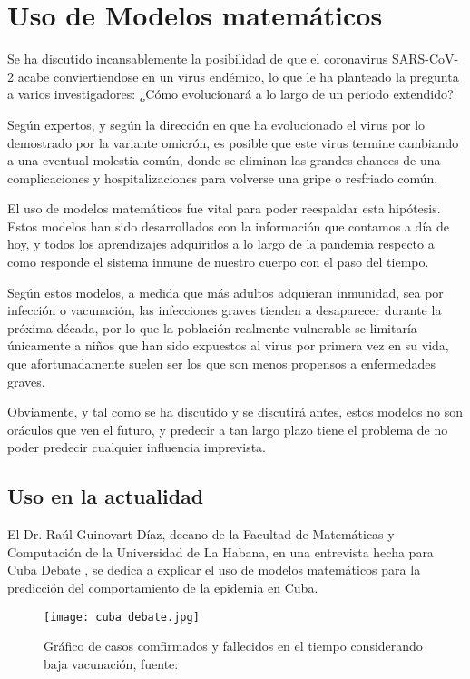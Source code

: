 \section{Uso de Modelos matemáticos}
Se ha discutido incansablemente la posibilidad de que el coronavirus SARS-CoV-2 acabe conviertiendose en un virus endémico, lo que le ha planteado la pregunta a varios investigadores: ¿Cómo evolucionará a lo largo de un periodo extendido?

Según expertos, y según la dirección en que ha evolucionado el virus por lo demostrado por la variante omicrón, es posible que este virus termine cambiando a una eventual molestia común, donde se eliminan las grandes chances de una complicaciones y hospitalizaciones para volverse una gripe o resfriado común.

El uso de modelos matemáticos fue vital para poder reespaldar esta hipótesis. Estos modelos han sido desarrollados con la información que contamos a día de hoy, y todos los aprendizajes adquiridos a lo largo de la pandemia respecto a como responde el sistema inmune de nuestro cuerpo con el paso del tiempo.

Según estos modelos, a medida que más adultos adquieran inmunidad, sea por infección o vacunación, las infecciones graves tienden a desaparecer durante la próxima década, por lo que la población realmente vulnerable se limitaría únicamente a niños que han sido expuestos al virus por primera vez en su vida, que afortunadamente suelen ser los que son menos propensos a enfermedades graves.

Obviamente, y tal como se ha discutido y se discutirá antes, estos modelos no son oráculos que ven el futuro, y predecir a tan largo plazo tiene el problema de no poder predecir cualquier influencia imprevista.

\subsection{Uso en la actualidad}
El Dr. Raúl Guinovart Díaz, decano de la Facultad de Matemáticas y Computación de la Universidad de La Habana, en una entrevista hecha para Cuba Debate \cite{falcon_reinaldo_arcemontero_izquieroferrer_farinasacostarodriguezmartines_2021}, se dedica a explicar el uso de modelos matemáticos para la predicción del comportamiento de la epidemia en Cuba.

\begin{figure}
    \texttt{[image: cuba debate.jpg]}
    \caption{Gráfico de casos comfirmados y fallecidos en el tiempo considerando baja vacunación, fuente: \cite{falcon_reinaldo_arcemontero_izquieroferrer_farinasacostarodriguezmartines_2021}}
    \label{casos cuba debate}
\end{figure}

